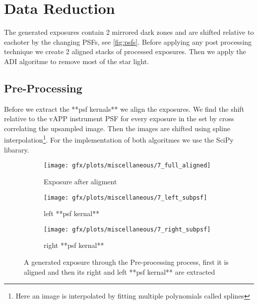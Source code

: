 
\chapter{Data Reduction} %
\label{ch:data_red} %
The generated exposures contain 2 mirrored dark zones and are shifted relative to eachoter by the changing \acp{PSF}, see \autoref{fig:psfs}. Before applying any post processing technique we create 2 aligned stacks of processed exposures. Then we apply the \ac{ADI} algoritme to remove most of the star light.

\section{Pre-Processing}
Before we extract the **psf kernals** we align the exposures. We find the shift relative to the \ac{vAPP} instrument \ac{PSF} for every exposure in the set by cross correlating the upsampled image. Then the images are shifted using spline interpolation\footnote{Here an image is interpolated by fitting multiple polynomials called splines}. For the implementation of both algoritmes we use the SciPy libarary\cite{scipy}.

\begin{figure}[h!]
  
      \begin{subfigure}[b]{0.5\textwidth}
        \texttt{[image: gfx/plots/miscellaneous/7\_full\_aligned]}
        \caption{Exposure after aligment}
      \end{subfigure}%
      
      \begin{subfigure}[b]{0.5\textwidth}
        \texttt{[image: gfx/plots/miscellaneous/7\_left\_subpsf]}
        \caption{left **psf kernal**}
        \label{fig:slice_a}
      \end{subfigure}      
      \begin{subfigure}[b]{0.5\textwidth}
        \texttt{[image: gfx/plots/miscellaneous/7\_right\_subpsf]}
        \caption{right **psf kernal**}
        \label{fig:slice_b}
      \end{subfigure}%

  \caption{A generated exposure through the Pre-processing process, first it is aligned and then its right and left **psf kernal** are extracted}
  \label{fig:psfs_evolving}
\end{figure}

